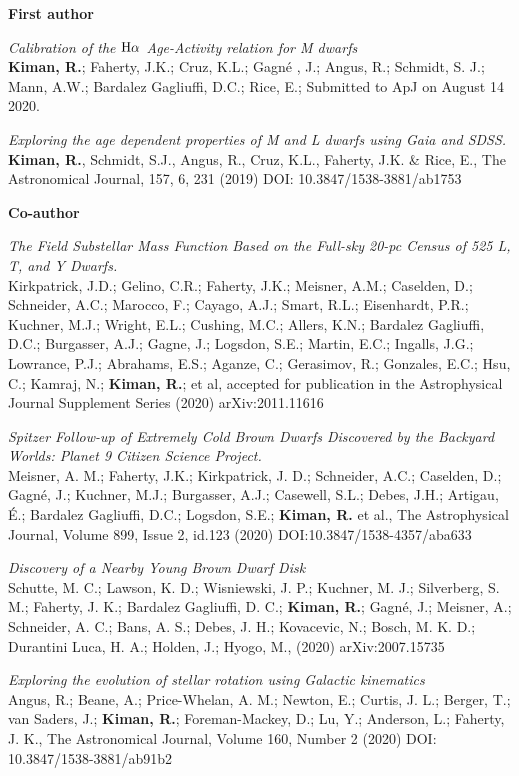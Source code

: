 \documentclass[10pt]{cv}
\begin{document}
\begin{llist}

\textbf{First author}

\textit{Calibration of the ${\rm H}\alpha$ Age-Activity relation for M dwarfs}\\
\textbf{Kiman, R.}; Faherty, J.K.; Cruz, K.L.; Gagn\'e , J.; Angus, R.; Schmidt, S. J.; Mann, A.W.; Bardalez Gagliuffi, D.C.; Rice, E.; Submitted to ApJ on August 14 2020. 

\textit{Exploring the age dependent properties of M and L dwarfs using \textit{Gaia} and SDSS.}\\
\textbf{Kiman, R.}, Schmidt, S.J., Angus, R., Cruz, K.L., Faherty, J.K. \& Rice, E., The Astronomical Journal, 157, 6, 231 (2019) DOI: 10.3847/1538-3881/ab1753 

\textbf{Co-author}

\textit{The Field Substellar Mass Function Based on the Full-sky 20-pc Census of 525 L, T, and Y Dwarfs.}\\
Kirkpatrick, J.D.; Gelino, C.R.; Faherty, J.K.; Meisner, A.M.; Caselden, D.; Schneider, A.C.; Marocco, F.; Cayago, A.J.; Smart, R.L.; Eisenhardt, P.R.; Kuchner, M.J.; Wright, E.L.; Cushing, M.C.; Allers, K.N.; Bardalez Gagliuffi, D.C.; Burgasser, A.J.; Gagne, J.; Logsdon, S.E.; Martin, E.C.; Ingalls, J.G.; Lowrance, P.J.; Abrahams, E.S.; Aganze, C.; Gerasimov, R.; Gonzales, E.C.; Hsu, C.; Kamraj, N.; \textbf{​Kiman, R.}​; et al, accepted for publication in the Astrophysical Journal Supplement Series (2020) arXiv:2011.11616

\textit{Spitzer Follow-up of Extremely Cold Brown Dwarfs Discovered by the Backyard Worlds: Planet 9 Citizen Science Project.}\\
Meisner, A. M.; Faherty, J.K.; Kirkpatrick, J. D.; Schneider, A.C.; Caselden, D.; Gagné, J.; Kuchner, M.J.; Burgasser, A.J.; Casewell, S.L.; Debes, J.H.; Artigau, É.; Bardalez Gagliuffi, D.C.; Logsdon, S.E.; \textbf{Kiman, R.} et al., The Astrophysical Journal, Volume 899, Issue 2, id.123 (2020) DOI:10.3847/1538-4357/aba633

\textit{Discovery of a Nearby Young Brown Dwarf Disk}\\
Schutte, M. C.; Lawson, K. D.; Wisniewski, J. P.; Kuchner, M. J.; Silverberg, S. M.; Faherty, J. K.; Bardalez Gagliuffi, D. C.; \textbf{Kiman, R.}; Gagné, J.; Meisner, A.; Schneider, A. C.; Bans, A. S.; Debes, J. H.; Kovacevic, N.; Bosch, M. K. D.; Durantini Luca, H. A.; Holden, J.; Hyogo, M., (2020) arXiv:2007.15735

\textit{Exploring the evolution of stellar rotation using Galactic kinematics}\\
Angus, R.; Beane, A.; Price-Whelan, A. M.; Newton, E.; Curtis, J. L.; Berger, T.; van Saders, J.; \textbf{Kiman, R.}; Foreman-Mackey, D.; Lu, Y.; Anderson, L.; Faherty, J. K., The Astronomical Journal, Volume 160, Number 2 (2020) DOI: 10.3847/1538-3881/ab91b2


\end{llist}
\end{document}
